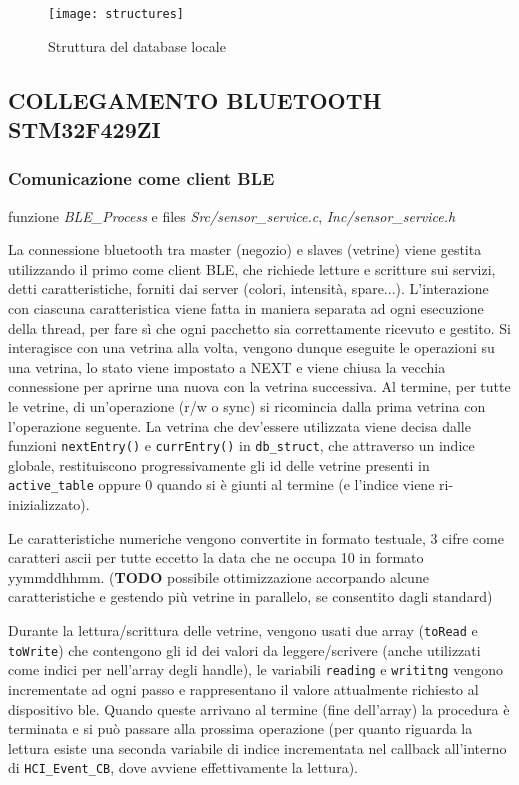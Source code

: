 \begin{figure}
	\texttt{[image: structures]}
  \caption{Struttura del database locale}
\end{figure}

\subsection{COLLEGAMENTO BLUETOOTH STM32F429ZI}

\subsubsection{Comunicazione come client BLE}

funzione \textit{BLE\_Process} e files \textit{Src/sensor\_service.c}, \textit{Inc/sensor\_service.h}

La connessione bluetooth tra master (negozio) e slaves (vetrine) viene gestita utilizzando il primo come client BLE, che richiede letture e scritture sui servizi, detti caratteristiche, forniti dai server (colori, intensit\`a, spare...). L'interazione con ciascuna caratteristica viene fatta in maniera separata ad ogni esecuzione della thread, per fare s\`i che ogni pacchetto sia correttamente ricevuto e gestito. Si interagisce con una vetrina alla volta, vengono dunque eseguite le operazioni su una vetrina, lo stato viene impostato a NEXT e viene chiusa la vecchia connessione per aprirne una nuova con la vetrina successiva. Al termine, per tutte le vetrine, di un'operazione (r/w o sync) si ricomincia dalla prima vetrina con l'operazione seguente. La vetrina che dev'essere utilizzata viene decisa dalle funzioni \texttt{nextEntry()} e \texttt{currEntry()} in \texttt{db\_struct}, che attraverso un indice globale, restituiscono progressivamente gli id delle vetrine presenti in \texttt{active\_table} oppure 0 quando si \`e giunti al termine (e l'indice viene ri-inizializzato). 

Le caratteristiche numeriche vengono convertite in formato testuale, 3 cifre come caratteri ascii per tutte eccetto la data che ne occupa 10 in formato yymmddhhmm. (\textbf{TODO} possibile ottimizzazione accorpando alcune caratteristiche e gestendo pi\`u vetrine in parallelo, se consentito dagli standard)

Durante la lettura/scrittura delle vetrine, vengono usati due array (\texttt{toRead} e \texttt{toWrite}) che contengono gli id dei valori da leggere/scrivere (anche utilizzati come indici per nell'array degli handle), le variabili \texttt{reading} e \texttt{writitng} vengono incrementate ad ogni passo e rappresentano il valore attualmente richiesto al dispositivo ble. Quando queste arrivano al termine (fine dell'array) la procedura \`e terminata e si pu\`o passare alla prossima operazione (per quanto riguarda la lettura esiste una seconda variabile di indice incrementata nel callback all'interno di \texttt{HCI\_Event\_CB}, dove avviene effettivamente la lettura).

